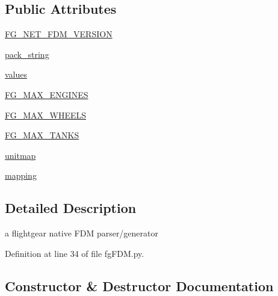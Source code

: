 \subsection*{Public Attributes}
\begin{DoxyCompactItemize}
\item 
\mbox{\hyperlink{classpymavlink_1_1fgFDM_1_1fgFDM_a9da6cc96e73c70f448aa0e47f831abe4}{F\+G\+\_\+\+N\+E\+T\+\_\+\+F\+D\+M\+\_\+\+V\+E\+R\+S\+I\+ON}}
\item 
\mbox{\hyperlink{classpymavlink_1_1fgFDM_1_1fgFDM_a1dc96e0247dd5d40de4108f7aecadcc5}{pack\+\_\+string}}
\item 
\mbox{\hyperlink{classpymavlink_1_1fgFDM_1_1fgFDM_a77870d99ab6aedd39276f1a008e790a7}{values}}
\item 
\mbox{\hyperlink{classpymavlink_1_1fgFDM_1_1fgFDM_ad756860723bcc8899b72df6596798e49}{F\+G\+\_\+\+M\+A\+X\+\_\+\+E\+N\+G\+I\+N\+ES}}
\item 
\mbox{\hyperlink{classpymavlink_1_1fgFDM_1_1fgFDM_a56f932135f71445c9e0627abe4db8360}{F\+G\+\_\+\+M\+A\+X\+\_\+\+W\+H\+E\+E\+LS}}
\item 
\mbox{\hyperlink{classpymavlink_1_1fgFDM_1_1fgFDM_a877a5b1c7125f4f3a343855eecee4722}{F\+G\+\_\+\+M\+A\+X\+\_\+\+T\+A\+N\+KS}}
\item 
\mbox{\hyperlink{classpymavlink_1_1fgFDM_1_1fgFDM_a460d76fcf614539c171770108ed83756}{unitmap}}
\item 
\mbox{\hyperlink{classpymavlink_1_1fgFDM_1_1fgFDM_ad1c72a439d291c91cc90d1f4f091a78b}{mapping}}
\end{DoxyCompactItemize}


\subsection{Detailed Description}
\begin{DoxyVerb}a flightgear native FDM parser/generator\end{DoxyVerb}
 

Definition at line 34 of file fg\+F\+D\+M.\+py.



\subsection{Constructor \& Destructor Documentation}
\mbox{\label{classpymavlink_1_1fgFDM_1_1fgFDM_ac2108e870de5be20a8352a314358391c}} 
